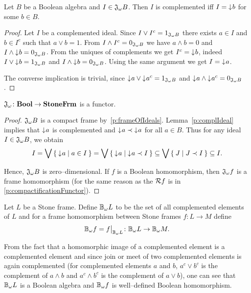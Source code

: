\begin{lemma}\label{p:complIdeal}
    Let $B$ be a Boolean algebra and $I \in \mathfrak{J}_{\omega} B$. Then $I$ is complemented iff $I = \mathord{\downarrow}\mkern1mu b$ for some $b \in B$.
\end{lemma}
\begin{proof}
    Let $I$ be a complemented ideal. Since $I \vee I^c = 1_{\mathfrak{J}_{\omega} B}$ there exists $a \in I$ and $b \in I^c$ such that $a \vee b = 1$. From $I \wedge I^c = 0_{\mathfrak{J}_{\omega} B}$ we have $a \wedge b = 0$ and $I \wedge \mathord{\downarrow}\mkern1mu b = 0_{\mathfrak{J}_{\omega} B}$.
    From the uniques of complements we get $I^c = \mathord{\downarrow}\mkern1mu b$, indeed $I \vee \mathord{\downarrow}\mkern1mu b = 1_{\mathfrak{J}_{\omega} B}$ and $I \wedge \mathord{\downarrow}\mkern1mu b = 0_{\mathfrak{J}_{\omega} B}$. Using the same argument we get $I = \mathord{\downarrow}\mkern1mu a$.

    The converse implication is trivial, since $\mathord{\downarrow}\mkern1mu a \vee \mathord{\downarrow}\mkern1mu a^c = 1_{\mathfrak{J}_{\omega} B}$ and $\mathord{\downarrow}\mkern1mu a \wedge \mathord{\downarrow}\mkern1mu a^c = 0_{\mathfrak{J}_{\omega} B}$.
\end{proof}

\begin{proposition}\label{p:JisFunctor}
    $\mathfrak{J}_{\omega}\colon \mathbf{Bool} \to \mathbf{StoneFrm}$ is a functor.
\end{proposition}
\begin{proof}
    $\mathfrak{J}_{\omega} B$ is a compact frame by~\ref{p:frameOfIdeals}. Lemma~\ref{p:complIdeal} implies that $\mathord{\downarrow}\mkern1mu a$ is complemented and $\mathord{\downarrow}\mkern1mu a \prec \mathord{\downarrow}\mkern1mu a$ for all $a \in B$. Thus for any ideal $I \in \mathfrak{J}_{\omega} B$, we obtain
    $$ I = \bigvee \Set{ \mathord{\downarrow}\mkern1mua | a \in I } = \bigvee \Set{ \mathord{\downarrow}\mkern1mua | \mathord{\downarrow}\mkern1mua \prec I } \subseteq \bigvee \Set{ J | J \prec I } \subseteq I.$$

\noindent Hence, $\mathfrak{J}_{\omega} B$ is zero--dimensional. If $f$ is a Boolean homomorphism, then $\mathfrak{J}_{\omega} f$ is a frame homomorphism (for the same reason as the $\mathcal{R} f$ is in \ref{p:compactificationFunctor}).
\end{proof}

\begin{definition}
    Let $L$ be a Stone frame. Define $\DEFSYM{BcO}{$\BcO{}$} L$ to be the set of all complemented elements of $L$ and for a frame homomorphism between Stone frames $f\colon L \to M$ define
    $$\BcO f = \restr{f}{\BcO L}\colon \BcO L \to \BcO M.$$
\end{definition}

From the fact that a homomorphic image of a complemented element is a complemented element and since join or meet of two complemented elements is again complemented (for complemented elements $a$ and $b$, $a^c \vee b^c$ is the complement of $a\wedge b$ and $a^c\wedge b^c$ is the complement of $a\vee b$), one can see that $\mathbb{B}_{\omega} L$ is a Boolean algebra and $\mathbb{B}_{\omega} f$ is well--defined Boolean homomorphism.

